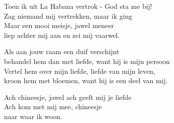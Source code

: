 \clearpage
\begin{translation}
Toen ik uit La Habana vertrok - God sta me bij!\\
Zag niemand mij vertrekken, maar ik ging\\
Maar een mooi meisje, jawel meneer\\
liep achter mij aan en zei mij vaarwel.\vspace{\wlskip}

Als aan jouw raam een duif verschijnt\\
behandel hem dan met liefde, want hij is mijn persoon\\
Vertel hem over mijn liefde, liefde van mijn leven,\\
kroon hem met bloemen, want hij is een deel van mij.\vspace{\wlskip}

Ach chineesje, jawel ach geeft mij je liefde\\
Ach kom met mij mee, chineesje\\
naar waar ik woon.
\end{translation}
